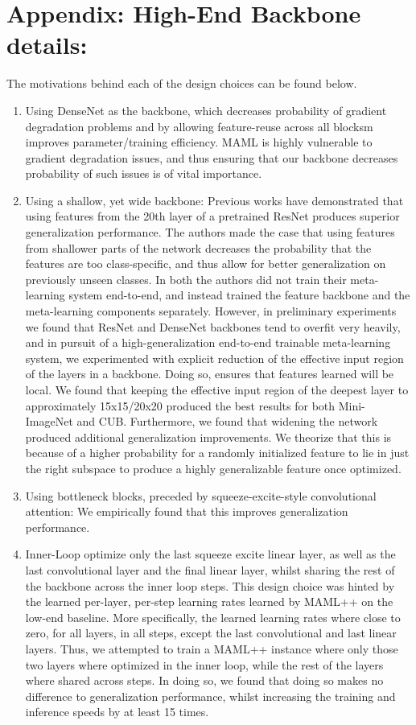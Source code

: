 \documentclass{article} \usepackage[dvipsnames]{xcolor}
\begin{document}
\section{Appendix: High-End Backbone details:}\label{appendix-high-end-design-choices}
The motivations behind each of the design choices can be found below.
\begin{enumerate}
    \item Using DenseNet as the backbone, which decreases probability of gradient degradation problems and by allowing feature-reuse across all blocksm improves parameter/training efficiency. MAML is highly vulnerable to gradient degradation issues, and thus ensuring that our backbone decreases probability of such issues is of vital importance.
    \item Using a shallow, yet wide backbone: Previous works \cite{qiao2018few,rusu2018meta} have demonstrated that using features from the 20th layer of a pretrained ResNet produces superior generalization performance. The authors made the case that using features from shallower parts of the network decreases the probability that the features are too class-specific, and thus allow for better generalization on previously unseen classes. In both \cite{qiao2018few,rusu2018meta} the authors did not train their meta-learning system end-to-end, and instead trained the feature backbone and the meta-learning components separately. However, in preliminary experiments we found that ResNet and DenseNet backbones tend to overfit very heavily, and in pursuit of a high-generalization end-to-end trainable meta-learning system, we experimented with explicit reduction of the effective input region of the layers in a backbone. Doing so, ensures that features learned will be local. We found that keeping the effective input region of the deepest layer to approximately 15x15/20x20 produced the best results for both Mini-ImageNet and CUB. Furthermore, we found that widening the network produced additional generalization improvements. We theorize that this is because of a higher probability for a randomly initialized feature to lie in just the right subspace to produce a highly generalizable feature once optimized.
    \item Using bottleneck blocks, preceded by squeeze-excite-style\cite{hu2018squeeze} convolutional attention: We empirically found that this improves generalization performance.
    \item Inner-Loop optimize only the last squeeze excite linear layer, as well as the last convolutional layer and the final linear layer, whilst sharing the rest of the backbone across the inner loop steps. This design choice was hinted by the learned per-layer, per-step learning rates learned by MAML++ on the low-end baseline. More specifically, the learned learning rates where close to zero, for all layers, in all steps, except the last convolutional and last linear layers. Thus, we attempted to train a MAML++ instance where only those two layers where optimized in the inner loop, while the rest of the layers where shared across steps. In doing so, we found that doing so makes no difference to generalization performance, whilst increasing the training and inference speeds by at least 15 times. 
\end{enumerate}
\end{document}
